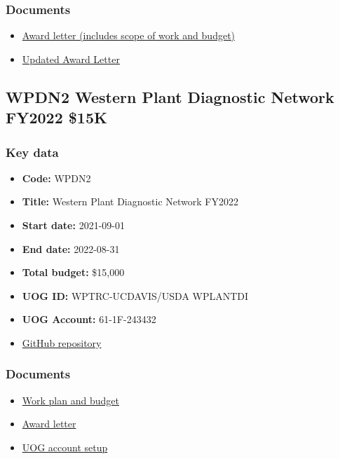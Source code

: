 \subsubsection{Documents}
\begin{itemize}
	\setlength\itemsep{0em}	
	\item \href{https://github.com/aubreymoore/Hypollimnas-octocula-conservation/blob/master/8spot-award-notice.pdf}{Award letter (includes scope of work and budget)}
	\item \href{https://github.com/aubreymoore/Hypollimnas-octocula-conservation/blob/master/8spot-award-notice-updated.pdf}{Updated Award Letter}
\end{itemize}




\newpage
\subsection{WPDN2 Western Plant Diagnostic Network FY2022 \$15K}
\label{WPDN2}

\subsubsection{Key data}
\begin{itemize}
	\setlength\itemsep{0em}	
	\item \textbf{Code:} WPDN2
	\item \textbf{Title:} Western Plant Diagnostic Network FY2022
	\item \textbf{Start date:} 2021-09-01
	\item \textbf{End date:} 2022-08-31
	\item \textbf{Total budget:} \$15,000
	\item \textbf{UOG ID:} WPTRC-UCDAVIS/USDA WPLANTDI
	\item \textbf{UOG Account:} 61-1F-243432
	\item \href{https://github.com/aubreymoore/WPDN}{GitHub repository}
\end{itemize}

\subsubsection{Documents}
\begin{itemize}
	\setlength\itemsep{0em}	
	\item \href{https://github.com/aubreymoore/WPDN/blob/main/WPDN\%202021-2022\%20workplan\%20and\%20budget.pdf}{Work plan and budget}
	\item \href{https://github.com/aubreymoore/WPDN/raw/main/FY2022/WPDN-FY2022-Award-Letter.pdf}{Award letter}
	\item \href{https://github.com/aubreymoore/WPDN/raw/main/FY2022/UOG-account-setup.pdf}{UOG account setup}
\end{itemize}


